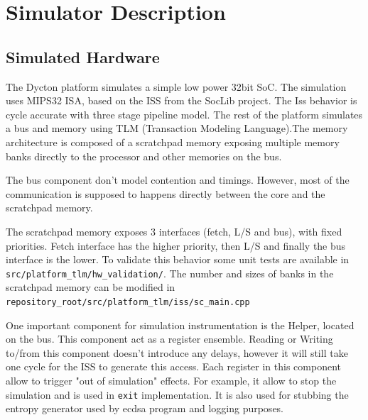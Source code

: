 \documentclass[10 pt]{article}
\begin{document}
\section{Simulator Description}

\subsection{Simulated Hardware}

The Dycton platform simulates a simple low power 32bit SoC. The simulation uses MIPS32 ISA, based on the ISS from the SocLib project. The Iss behavior is cycle accurate with three stage pipeline model.
The rest of the platform simulates a bus and memory using TLM (Transaction Modeling Language).The memory architecture is composed of a scratchpad memory exposing multiple memory banks directly to the processor and other memories on the bus.

\bigskip
The bus component don't model contention and timings. However, most of the communication is supposed to happens directly between the core and the scratchpad memory.

\bigskip
The scratchpad memory exposes 3 interfaces (fetch, L/S and bus), with fixed priorities. Fetch interface has the higher priority, then L/S and finally the bus interface is the lower.
To validate this behavior some unit tests are available in \lstinline{src/platform_tlm/hw_validation/}.
The number and sizes of banks in the scratchpad memory can be modified in \\ \lstinline{repository_root/src/platform_tlm/iss/sc_main.cpp}

\bigskip
One important component for simulation instrumentation is the Helper, located on the bus.
This component act as a register ensemble.
Reading or Writing to/from this component doesn't introduce any delays, however it will still take one cycle for the ISS to generate this access.
Each register in this component allow to trigger "out of simulation" effects.
For example, it allow to stop the simulation and is used in \lstinline{exit} implementation.
It is also used for stubbing the entropy generator used by ecdsa program and logging purposes.
\end{document}
